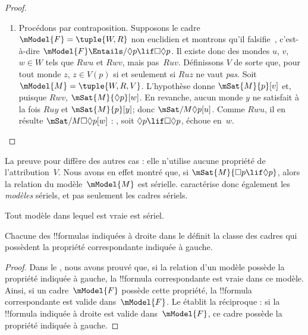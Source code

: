 \documentclass[../../../include/open-logic-section]{subfiles}
\begin{document}
\begin{proof}
\begin{enumerate}
    montrons $Ruw$. Définissons $V$ de sorte que,
    pour tout monde~$z$, $z \in V(p)$ si et seulement si
    $Ruz$ (et choisissons
    arbitrairement les valeurs des autres variables). Soit
    $\mModel{M} =\tuple{W, R, V}$. Par définition de~$V$,
    $\mSat{M}{p}[z]$ pour tout $z$ tel que $Ruz$,
    et donc $\mSat{M}{\Box p}[u]$. Mais, par hypothèse,
    , soit $\Box p \lif \Box \Box p$, est vraie
    en~$u$; ainsi $\mSat{M}{\Box \Box p}[u]$.
    Comme $Ruv$ et $Rvw$, il en découle
    $\mSat{M}{p}[w]$. Par définition de~$V$, cela
    n'est possible que si $Ruw$, comme voulu.
  \item Procédons par contraposition. Supposons le cadre
    $\mModel{F} = \tuple{W, R}$ non euclidien et montrons
    qu'il falsifie~, c'est-à-dire
    $\mModel{F} \Entails/ \Diamond p \lif \Box\Diamond p$.
    Il existe donc des mondes $u$, $v$, $w \in W$ tels que
    $Rwu$ et $Rwv$, mais pas~$Ruv$. Définissons $V$ de
    sorte que, pour tout monde $z$, $z \in V(p)$ si et
    seulement si $Ruz$ ne vaut \emph{pas}. Soit
    $\mModel{M} =\tuple{W, R, V}$. L'hypothèse donne
    $\mSat{M}{p}[v]$ et, puisque $Rwv$,
    $\mSat{M}{\Diamond p}[w]$. En revanche, aucun monde
    $y$ ne satisfait à la fois $Ruy$ et
    $\mSat{M}{p}[y]$; donc
    $\mSat/{M}{\Diamond p}[u]$. Comme $Rwu$, il en
    résulte $\mSat/{M}{\Box\Diamond p}[w]$ : ,
    soit $\Diamond p \lif \Box\Diamond p$, échoue
    en~$w$.
  \end{enumerate}
\end{proof}

La preuve pour  diffère des autres cas : elle n'utilise
aucune propriété de l'attribution~$V$. Nous avons en effet montré
que, si $\mSat{M}{\Box p \lif \Diamond p}$, alors la relation
du modèle~$\mModel{M}$ est sérielle.  caractérise donc
également les \emph{modèles} sériels, et pas seulement les cadres
sériels.

\begin{cor}
  Tout modèle dans lequel  est vraie est sériel.
\end{cor}

\begin{cor}
Chacune des !!{formula}s indiquées à droite dans le
 définit la classe des cadres qui
possèdent la propriété correspondante indiquée à gauche.
\end{cor}

\begin{proof}
  Dans le , nous avons prouvé que,
  si la relation d'un modèle possède la propriété indiquée
  à gauche, la !!{formula} correspondante est vraie dans ce
  modèle. Ainsi, si un cadre~$\mModel{F}$ possède cette
  propriété, la !!{formula} correspondante est valide
  dans~$\mModel{F}$. Le
   établit la réciproque :
  si la !!{formula} indiquée à droite est valide
  dans~$\mModel{F}$, ce cadre possède la propriété
  indiquée à gauche.
\end{proof}
\end{document}
